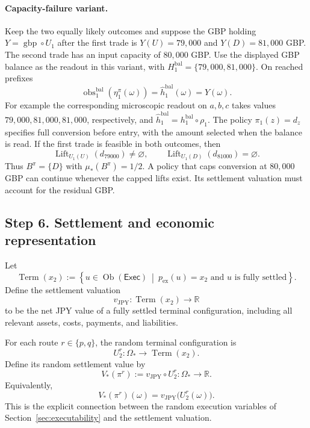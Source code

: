 \documentclass[11pt,a4paper]{article}
\begin{document}
\paragraph{Capacity-failure variant.}
Keep the two equally likely outcomes and suppose the GBP holding
$Y=\operatorname{gbp}\circ U_1$ after the first trade is
$Y(U)=79{,}000$ and $Y(D)=81{,}000$ GBP. The second trade has an input
capacity of $80{,}000$ GBP. Use the displayed GBP balance as the readout
in this variant, with $H_1^{\mathrm{bal}}=\{79{,}000,81{,}000\}$.
On reached prefixes
\[
  \operatorname{obs}^{\mathrm{bal}}_1(\eta_1^\pi(\omega))
  =\widehat h^{\mathrm{bal}}_1(\omega)=Y(\omega).
\]
For example the corresponding microscopic readout on $a,b,c$ takes
values $79{,}000,81{,}000,81{,}000$, respectively, and
$\widehat h^{\mathrm{bal}}_1=h^{\mathrm{bal}}_1\circ\rho_1$.
The policy $\pi_1(z)=d_z$ specifies full conversion before entry, with
the amount selected when the balance is read. If the first trade is
feasible in both outcomes, then
\[
  \operatorname{Lift}_{U_1(U)}(d_{79000})\ne\varnothing,\qquad
  \operatorname{Lift}_{U_1(D)}(d_{81000})=\varnothing.
\]
Thus $B^\pi=\{D\}$ with $\mu_*(B^\pi)=1/2$. A policy that caps conversion
at $80{,}000$ GBP can continue whenever the capped lifts exist.
Its settlement valuation must account for the residual GBP.

\subsection{Step 6. Settlement and economic representation}

Let
\[
  \operatorname{Term}(x_2)
  :=
  \left\{
    u\in\operatorname{Ob}(\mathsf{Exec})
    \ \middle|\
    p_{\mathrm{ex}}(u)=x_2
    \text{ and }u\text{ is fully settled}
  \right\}.
\]
Define the settlement valuation
\[
  v_{\mathrm{JPY}}:
  \operatorname{Term}(x_2)\longrightarrow\mathbb R
\]
to be the net JPY value of a fully settled terminal configuration,
including all relevant assets, costs, payments, and liabilities.

For each route $r\in\{p,q\}$, the random
terminal configuration is
\[
  U_2^r:\Omega_*\longrightarrow\operatorname{Term}(x_2).
\]
Define its random settlement value by
\[
  V_*(\pi^r)
  :=
  v_{\mathrm{JPY}}\circ U_2^r:
  \Omega_*\longrightarrow\mathbb R.
\]
Equivalently,
\[
  V_*(\pi^r)(\omega)
  =
  v_{\mathrm{JPY}}\bigl(U_2^r(\omega)\bigr).
\]
This is the explicit connection between the random execution
variables of 
Section~\ref{sec:executability}
and the settlement valuation.
\end{document}
